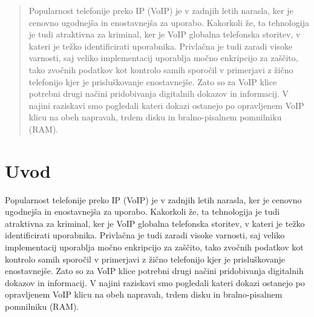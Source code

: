 \documentclass{acm_proc_article-sp}
\begin{document}
\date{30 July 1999}
\usepackage[slovenian]{babel}
\maketitle
\begin{abstract}
Popularnost telefonije preko IP (VoIP) je v zadnjih letih narasla, ker je cenovno ugodnejša in enostavnejša za uporabo. Kakorkoli že, ta tehnologija je tudi atraktivna za kriminal, ker je VoIP globalna telefonska storitev, v kateri je težko identificirati uporabnika. Privlačna je tudi zaradi visoke varnosti, saj veliko implementacij uporablja močno enkripcijo za zaščito, tako zvočnih podatkov kot kontrolo samih sporočil v primerjavi z žično telefonijo kjer je prisluškovanje enostavnejše. Zato so za VoIP klice potrebni drugi načini pridobivanja digitalnih dokazov in informacij. V najini raziskavi smo pogledali kateri dokazi ostanejo po opravljenem VoIP klicu na obeh napravah, trdem disku in bralno-pisalnem pomnilniku (RAM).

\end{abstract}



\section{Uvod}
Popularnost telefonije preko IP (VoIP) je v zadnjih letih narasla, ker je cenovno ugodnejša in enostavnejša za uporabo. Kakorkoli že, ta tehnologija je tudi atraktivna za kriminal, ker je VoIP globalna telefonska storitev, v kateri je težko identificirati uporabnika. Privlačna je tudi zaradi visoke varnosti, saj veliko implementacij uporablja močno enkripcijo za zaščito, tako zvočnih podatkov kot kontrolo samih sporočil v primerjavi z žično telefonijo kjer je prisluškovanje enostavnejše. Zato so za VoIP klice potrebni drugi načini pridobivanja digitalnih dokazov in informacij. V najini raziskavi smo pogledali kateri dokazi ostanejo po opravljenem VoIP klicu na obeh napravah, trdem disku in bralno-pisalnem pomnilniku (RAM).
\end{document}
